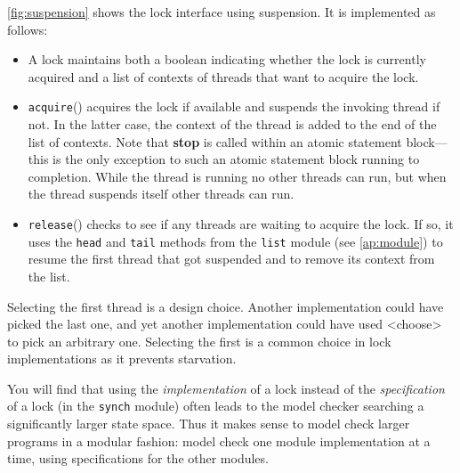 \documentclass{report}
\begin{document}
\autoref{fig:suspension} shows the lock interface using suspension.
It is implemented as follows:
\begin{itemize}
\item A lock maintains both a boolean indicating whether the
lock is currently acquired and a list of contexts of threads that want to
acquire the lock.
\item
\texttt{acquire}()
%
acquires the lock if available and suspends the invoking thread if not.
In the latter case, the context of the thread is added to the end of the list of contexts.
Note that \textbf{stop} is called within an atomic statement block---this is
the only exception to such an atomic statement block running to completion.
While the
thread is running no other threads can run, but when the thread suspends itself
other threads can run.
\item
\texttt{release}()
%
checks to see if any threads are waiting to acquire the lock.
If so, it uses the \texttt{head} and \texttt{tail}
methods from the \texttt{list} module (see \autoref{ap:module})
to resume the first thread that got
suspended and to remove its context from the list.
\end{itemize}
Selecting the first thread is a design choice.  Another implementation could
have picked the last one, and yet another implementation could have used
<{choose}> to pick an arbitrary one.  Selecting the first is a common
choice in lock implementations as it prevents starvation.

You will find that using the \emph{implementation} of a lock instead
of the \emph{specification} of a lock (in the \texttt{synch} module)
often leads to the model checker searching a
significantly larger state space.
Thus it makes sense to model check larger programs in a modular fashion:
model check one module implementation at a time, using
specifications for the other modules.
\end{document}
